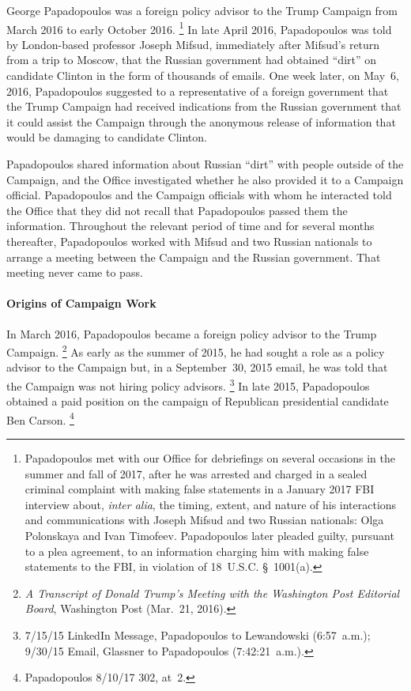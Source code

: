 George Papadopoulos was a foreign policy advisor to the Trump Campaign from March 2016 to early October 2016.%
\footnote{Papadopoulos met with our Office for debriefings on several occasions in the summer and fall of 2017, after he was arrested and charged in a sealed criminal complaint with making false statements in a January 2017 FBI interview about, \textit{inter alia}, the timing, extent, and nature of his interactions and communications with Joseph Mifsud and two Russian nationals: Olga Polonskaya and Ivan Timofeev.
Papadopoulos later pleaded guilty, pursuant to a plea agreement, to an information charging him with making false statements to the FBI, in violation of 18~U.S.C. \S~1001(a).}
In late April 2016, Papadopoulos was told by London-based professor Joseph Mifsud, immediately after Mifsud's return from a trip to Moscow, that the Russian government had obtained ``dirt'' on candidate Clinton in the form of thousands of emails.
One week later, on May~6, 2016, Papadopoulos suggested to a representative of a foreign government that the Trump Campaign had received indications from the Russian government that it could assist the Campaign through the anonymous release of information that would be damaging to candidate Clinton.

Papadopoulos shared information about Russian ``dirt'' with people outside of the Campaign, and the Office investigated whether he also provided it to a Campaign official.
Papadopoulos and the Campaign officials with whom he interacted told the Office that they did not recall that Papadopoulos passed them the information.
Throughout the relevant period of time and for several months thereafter, Papadopoulos worked with Mifsud and two Russian nationals to arrange a meeting between the Campaign and the Russian government.
That meeting never came to pass.

\paragraph{Origins of Campaign Work}

In March 2016, Papadopoulos became a foreign policy advisor to the Trump Campaign.%
\footnote{\textit{A Transcript of Donald Trump's Meeting with the Washington Post Editorial Board}, Washington Post (Mar.~21, 2016).}
As early as the summer of 2015, he had sought a role as a policy advisor to the Campaign but, in a September~30, 2015 email, he was told that the Campaign was not hiring policy advisors.%
\footnote{7/15/15 LinkedIn Message, Papadopoulos to Lewandowski (6:57~a.m.); 9/30/15 Email, Glassner to Papadopoulos (7:42:21~a.m.).}
In late 2015, Papadopoulos obtained a paid position on the campaign of Republican presidential candidate Ben Carson.%
\footnote{Papadopoulos 8/10/17 302, at~2.}

